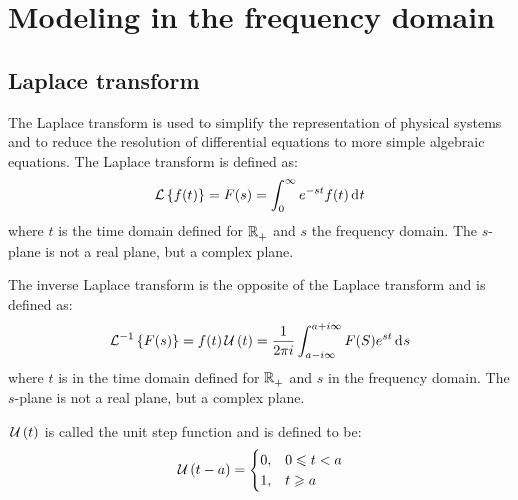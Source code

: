 \documentclass[10pt, twocolumn]{article}
\begin{document}
\section{Modeling in the frequency domain}
\subsection{Laplace transform}
The Laplace transform is used to simplify the representation of physical systems and to reduce the resolution of differential equations to more simple algebraic equations.
The Laplace transform is defined as:
\[
  \mathcal{L}\left\{ f(t) \right\} = F(s) = \int_0^\infty{e^{-st} f(t) \,\mathrm{d}^{} t}
\]
where \(t\) is the time domain defined for \(\mathbb{R}_{+}^{}\) and \(s\) the frequency domain.
The \(s\)-plane is not a real plane, but a complex plane.

The inverse Laplace transform is the opposite of the Laplace transform and is defined as:
\[
  \mathcal{L}^{-1}\left\{ F(s) \right\} = f(t)\,\mathcal{U}\left( t \right) = \frac{1}{2\pi i} \int_{a - i\infty}^{a + i\infty}{F(S) e^{st} \,\mathrm{d}^{} s}
\]
where \(t\) is in the time domain defined for \(\mathbb{R}_{+}^{}\) and \(s\) in the frequency domain.
The \(s\)-plane is not a real plane, but a complex plane.

\(\,\mathcal{U}\left( t \right)\) is called the unit step function and is defined to be:
\[
  \,\mathcal{U}\left( t - a \right) =
  \begin{cases}
    0, & 0 \leqslant t < a \\
    1, & t \geqslant a     \\
  \end{cases}
\]
\end{document}
